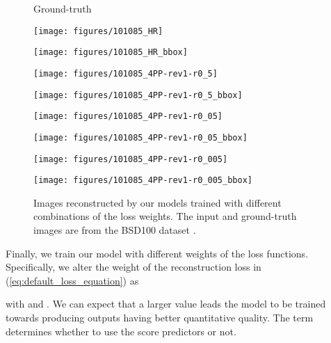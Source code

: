 \documentclass[runningheads]{llncs}
\begin{document}
\begin{figure}[t]
	\centering
	\begin{minipage}[b]{0.24\linewidth}
		\centering
		\centerline{\scriptsize{Ground-truth}}\medskip
		\centerline{\texttt{[image: figures/101085\_HR]}}\smallskip
		\centerline{\texttt{[image: figures/101085\_HR\_bbox]}}
	\end{minipage}
	\begin{minipage}[b]{0.24\linewidth}
		\centering
		\centerline{\scriptsize{}}\medskip
		\centerline{\texttt{[image: figures/101085\_4PP-rev1-r0\_5]}}\smallskip
		\centerline{\texttt{[image: figures/101085\_4PP-rev1-r0\_5\_bbox]}}
	\end{minipage}
	\begin{minipage}[b]{0.24\linewidth}
		\centering
		\centerline{\scriptsize{}}\medskip
		\centerline{\texttt{[image: figures/101085\_4PP-rev1-r0\_05]}}\smallskip
		\centerline{\texttt{[image: figures/101085\_4PP-rev1-r0\_05\_bbox]}}
	\end{minipage}
	\begin{minipage}[b]{0.24\linewidth}
		\centering
		\centerline{\scriptsize{}}\medskip
		\centerline{\texttt{[image: figures/101085\_4PP-rev1-r0\_005]}}\smallskip
		\centerline{\texttt{[image: figures/101085\_4PP-rev1-r0\_005\_bbox]}}
	\end{minipage}
	\caption{Images reconstructed by our models trained with different combinations of the loss weights. The input and ground-truth images are from the BSD100 dataset \cite{martin2001database}.}
	\label{fig:result_loss_weight_comparison}
\end{figure}


Finally, we train our model with different weights of the loss functions.
Specifically, we alter the weight of the reconstruction loss in (\ref{eq:default_loss_equation}) as

with  and .
We can expect that a larger  value leads the model to be trained towards producing outputs having better quantitative quality.
The term  determines whether to use the score predictors or not.
\end{document}
